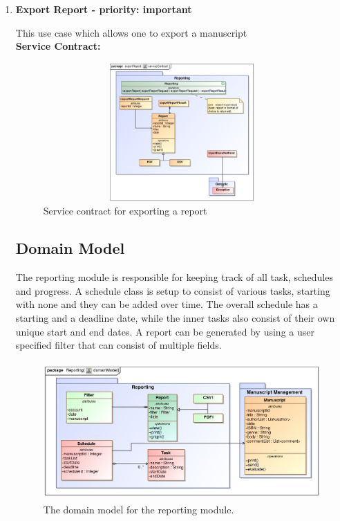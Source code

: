 \begin{enumerate}
\item \textbf{Export Report - priority: important}
\par{This use case which allows one to export a manuscript}\\
\textbf{Service Contract:} 

\begin{figure}[h]
\includegraphics[height=200px, width=500px]{epsImages/Reporting/exportReport.eps}
\caption{Service contract for exporting a report}
\end{figure}


\subsection{Domain Model}
\par{The reporting module is responsible for keeping track of all task, schedules and progress. A schedule class is setup to consist of various tasks, starting with none and they can be added over time. The overall schedule has a starting and a deadline date, while the inner tasks also consist of their own unique start and end dates. A report can be generated by using a user specified filter that can consist of multiple fields.}

\begin{figure}[h]
\includegraphics[height=200px, width=500px]{epsImages/DomainModels/Reporting.eps}
\caption{The domain model for the reporting module.}
\end{figure}
\newpage

\end{enumerate}

